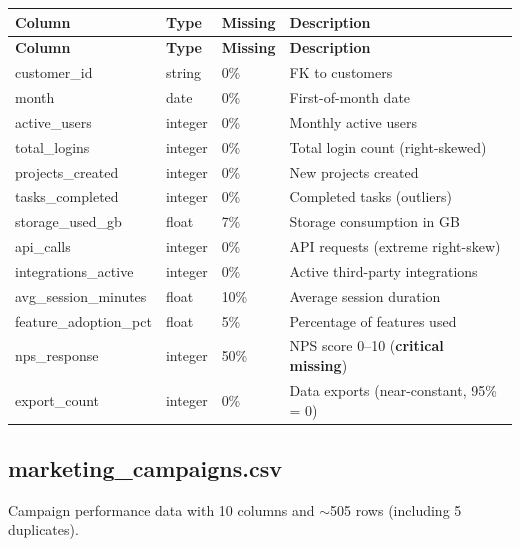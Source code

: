 \documentclass[11pt,a4paper]{article}
\begin{document}
\begin{center}
\begin{longtable}{lllp{5.5cm}}
    \toprule
    \textbf{Column} & \textbf{Type} & \textbf{Missing} & \textbf{Description} \\
    \midrule
    \endfirsthead
    \toprule
    \textbf{Column} & \textbf{Type} & \textbf{Missing} & \textbf{Description} \\
    \midrule
    \endhead
    customer\_id          & string  & 0\%  & FK to customers \\
    month                 & date    & 0\%  & First-of-month date \\
    active\_users         & integer & 0\%  & Monthly active users \\
    total\_logins         & integer & 0\%  & Total login count (right-skewed) \\
    projects\_created     & integer & 0\%  & New projects created \\
    tasks\_completed      & integer & 0\%  & Completed tasks (outliers) \\
    storage\_used\_gb     & float   & 7\%  & Storage consumption in GB \\
    api\_calls            & integer & 0\%  & API requests (extreme right-skew) \\
    integrations\_active  & integer & 0\%  & Active third-party integrations \\
    avg\_session\_minutes & float   & 10\% & Average session duration \\
    feature\_adoption\_pct& float   & 5\%  & Percentage of features used \\
    nps\_response         & integer & 50\% & NPS score 0--10 (\textbf{critical missing}) \\
    export\_count         & integer & 0\%  & Data exports (near-constant, 95\% = 0) \\
    \bottomrule
\end{longtable}
\end{center}

\subsection{marketing\_campaigns.csv}

Campaign performance data with 10 columns and $\sim$505 rows (including 5 duplicates).
\end{document}
